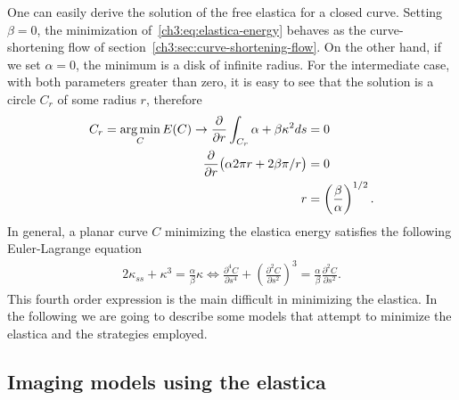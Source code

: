 One can easily derive the solution of the free elastica for a closed curve. Setting $\beta=0$, the minimization of~\cref{ch3:eq:elastica-energy} behaves as the curve-shortening flow of section~\cref{ch3:sec:curve-shortening-flow}. On the other hand, if we set $\alpha =0$, the minimum is a disk of infinite radius. For the intermediate case, with both parameters greater than zero, it is easy to see that the solution is a circle $C_r$ of some radius $r$, therefore
\begin{align*}
	C_r = \operatorname*{arg\,min}_C E(C) \rightarrow \frac{ \partial}{\partial r} \int_{C_r}{\alpha + \beta \kappa^2 ds} &= 0 \\
	\frac{\partial}{\partial r} \big( \alpha 2\pi r + 2\beta \pi/r \big) & = 0 \\
	r &= \left(\frac{\beta}{\alpha}\right)^{1/2}.
\end{align*}
%
In general, a planar curve $C$ minimizing the elastica energy satisfies the following Euler-Lagrange equation~\cite{chan02elasticainpainting,singer08lectures}
\begin{align}
		2\kappa_{ss} + \kappa^3 = \frac{\alpha}{\beta}\kappa \Leftrightarrow \frac{\partial ^4 C}{\partial s^4} + \left( \frac{\partial ^2 C}{\partial s^2} \right)^3 = \frac{\alpha}{\beta}\frac{\partial ^2 C}{\partial s^2}.
		\label{ch3:eq:euler-lagrange-equation-elastica}
\end{align}
%
%
This fourth order expression is the main difficult in minimizing the elastica. In the following we are going to describe some models that attempt to minimize the elastica and the strategies employed.

\subsection{Imaging models using the elastica}

